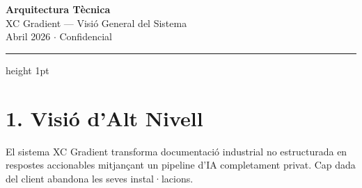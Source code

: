 \documentclass[11pt,a4paper]{article}
\begin{document}
\begin{center}
{\Huge\bfseries\color{dark} Arquitectura Tècnica}\\[0.3em]
{\Large\color{accent} XC Gradient --- Visió General del Sistema}\\[0.5em]
{\small\color{midgray} Abril 2026 $\cdot$ Confidencial}
\end{center}

\vspace{0.5em}
{\color{accent}\hrule height 1pt}
\vspace{1em}

\section{1. Visió d'Alt Nivell}

El sistema XC Gradient transforma documentació industrial no estructurada en respostes accionables mitjançant un pipeline d'IA completament privat. Cap dada del client abandona les seves instal·lacions.

\vspace{0.5em}
\end{document}
